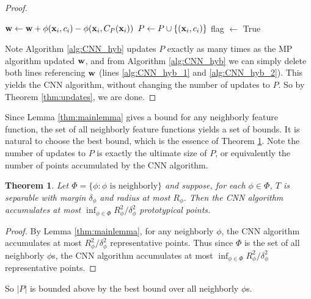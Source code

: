 \documentclass[preprint]{elsarticle}
\newtheorem{theorem}{Theorem}
\begin{document}
\begin{proof}
\begin{algorithm}[h!]
\begin{algorithmic}[1]
		\STATE ${\bf w} \leftarrow {\bf w} + \phi({\bf x}_i,c_i)-\phi({\bf x}_i,C_P({\bf x}_i))$ \label{alg:CNN_hyb_2}
		\STATE $P \leftarrow P \cup \{({\bf x}_i , c_i)\}$
		\STATE flag $\leftarrow$ True
	\ENDIF
\ENDFOR
\ENDWHILE
\end{algorithmic}
\end{algorithm}
Note Algorithm \ref{alg:CNN_hyb} updates $P$ exactly as many times as the MP algorithm updated ${\bf w}$, and from Algorithm \ref{alg:CNN_hyb} we can simply delete both lines referencing ${\bf w}$ (lines \ref{alg:CNN_hyb_1} and \ref{alg:CNN_hyb_2}). This yields the CNN algorithm, without changing the number of updates to $P$. So by Theorem \ref{thm:updates}, we are done.
\end{proof}

Since Lemma \ref{thm:mainlemma} gives a bound for any neighborly feature function, the set of all neighborly feature functions yields a set of bounds. It is natural to choose the best bound, which is the essence of Theorem \ref{thm:maintheorem}. Note the number of updates to $P$ is exactly the ultimate size of $P$, or equivalently the number of points accumulated by the CNN algorithm.

\begin{theorem}
\label{thm:maintheorem}
Let $\Phi = \{ \phi : \phi \text{ is neighborly} \}$ and suppose, for each $\phi \in \Phi$, $T$ is separable with margin $\delta_\phi$ and radius at most $R_\phi$. Then the CNN algorithm accumulates at most $\inf_{\phi \in \Phi} R_\phi^2 / \delta_\phi^2$ prototypical points.
\end{theorem}
\begin{proof}
By Lemma \ref{thm:mainlemma}, for any neighborly $\phi$, the CNN algorithm accumulates at most $R_\phi^2/\delta_\phi^2$ representative points. Thus since $\Phi$ is the set of all neighborly $\phi$s, the CNN algorithm accumulates at most $\inf_{\phi \in \Phi} R_\phi^2/\delta_\phi^2$ representative points.
\end{proof}

So $|P|$ is bounded above by the best bound over all neighborly $\phi$s. 
\end{document}
